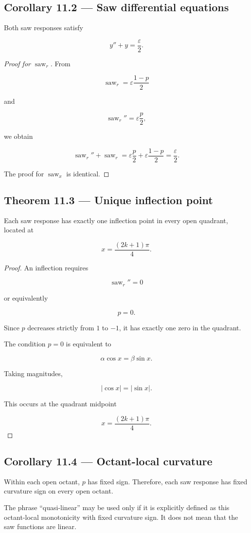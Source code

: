 \documentclass[11pt,oneside,openany]{book}
\newcommand{\PCsubsection}[1]{%
  \subsection*{#1}%
}
\begin{document}
\PCsubsection{Corollary 11.2 --- Saw differential equations}

Both saw responses satisfy

\[
\boxed{ y''+y=\frac{\varepsilon}{2} }.
\]

\begin{proof}[Proof for \(\operatorname{saw}_{r}\)]
From

\[
\operatorname{saw}_{r} = \varepsilon\frac{1-p}{2}
\]

and

\[
\operatorname{saw}_{r}'' = \varepsilon\frac p2,
\]

we obtain

\[
\operatorname{saw}_{r}'' + \operatorname{saw}_{r} = \varepsilon\frac p2 + \varepsilon\frac{1-p}{2} = \frac{\varepsilon}{2}.
\]


The proof for \(\operatorname{saw}_{x}\) is identical.

\end{proof}

\PCsubsection{Theorem 11.3 --- Unique inflection point}

Each saw response has exactly one inflection point in every open quadrant, located at

\[
\boxed{ x=\frac{(2k+1)\pi}{4} }.
\]

\begin{proof}
An inflection requires

\[
\operatorname{saw}_{r}''=0
\]

or equivalently

\[
p=0.
\]

Since \(p\) decreases strictly from \(1\) to \(-1\), it has exactly one zero in the quadrant.

The condition \(p=0\) is equivalent to

\[
\alpha\cos x=\beta\sin x.
\]

Taking magnitudes,

\[
|\cos x|=|\sin x|.
\]

This occurs at the quadrant midpoint

\[
x=\frac{(2k+1)\pi}{4}.
\]

\end{proof}

\PCsubsection{Corollary 11.4 --- Octant-local curvature}

Within each open octant, \(p\) has fixed sign. Therefore, each saw response has fixed curvature sign on every open octant.

The phrase “quasi-linear” may be used only if it is explicitly defined as this octant-local monotonicity with fixed curvature sign. It does not mean that the saw functions are linear.
\end{document}
